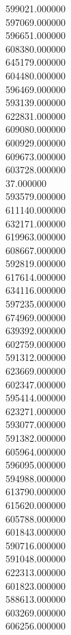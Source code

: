 599021.000000\\
597069.000000\\
596651.000000\\
608380.000000\\
645179.000000\\
604480.000000\\
596469.000000\\
593139.000000\\
622831.000000\\
609080.000000\\
600929.000000\\
609673.000000\\
603728.000000\\
37.000000\\
593579.000000\\
611140.000000\\
632171.000000\\
619963.000000\\
608667.000000\\
592819.000000\\
617614.000000\\
634116.000000\\
597235.000000\\
674969.000000\\
639392.000000\\
602759.000000\\
591312.000000\\
623669.000000\\
602347.000000\\
595414.000000\\
623271.000000\\
593077.000000\\
591382.000000\\
605964.000000\\
596095.000000\\
594988.000000\\
613790.000000\\
615620.000000\\
605788.000000\\
601843.000000\\
590716.000000\\
591048.000000\\
622313.000000\\
601823.000000\\
588613.000000\\
603269.000000\\
606256.000000\\
